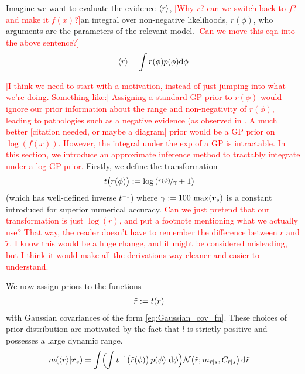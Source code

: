 \documentclass{article}
\begin{document}
Imagine we want to evaluate the evidence $\inty{r}$, \textcolor{red}{[Why $r$? can we switch back to $f$? and make it $f(x)$?]}an integral over non-negative likelihoods, $r(\phi)$, who arguments are the parameters of the relevant model. \textcolor{red}{[Can we move this eqn into the above sentence?]}
$$
\inty{r} = \int r(\phi) p(\phi) \ud\phi
$$

\textcolor{red}{[I think we need to start with a motivation, instead of just jumping into what we're doing.  Something like:] Assigning a standard GP prior to $r(\phi)$ would ignore our prior information about the range and non-negativity of $r(\phi)$, leading to pathologies such as a negative evidence (as observed in \citep{BZMonteCarlo}.  A much better [citation needed, or maybe a diagram] prior would be a GP prior on $\log(f(x))$.  However, the integral under the exp of a GP is intractable.  In this section, we introduce an approximate inference method to tractably integrate under a log-GP prior. }
Firstly, we define the transformation
\begin{align*}
t\bigl(r(\phi)\bigr) & \deq \log\left(\nicefrac{r(\phi)}{\gamma} + 1\right)
\end{align*}
(which has well-defined inverse $t\inv$) where 
$
 \gamma \deq 100\, \max(\vr_s)
$
is a constant introduced for superior numerical accuracy. \textcolor{red}{Can we just pretend that our transformation is just $\log(r)$, and put a footnote mentioning what we actually use?  That way, the reader doesn't have to remember the difference between $r$ and $\tilde{r}$.  I know this would be a huge change, and it might be considered misleading, but I think it would make all the derivations way cleaner and easier to understand.}

We now assign \gpb priors to the functions
\begin{align*}
 \tr & \deq  t(r)
\end{align*}
with Gaussian
covariances of the form \eqref{eq:Gaussian_cov_fn}.
These choices of prior distribution are motivated by the fact that
$l$ is strictly positive and possesses a large dynamic
range. 
%
%
\begin{align}
\mean{\inty{r}}{\vr_s}
&  =\int \Bigl( \int t\inv\bigr(\tr(\phi)\bigl)\,\po{\phi}\,\ud\phi\Bigr)
\N{\tr}{\meancondfn{\tr}{s}}{\covcondfn{\tr}{s}} \ud \tr \nonumber
\end{align}
\end{document}
